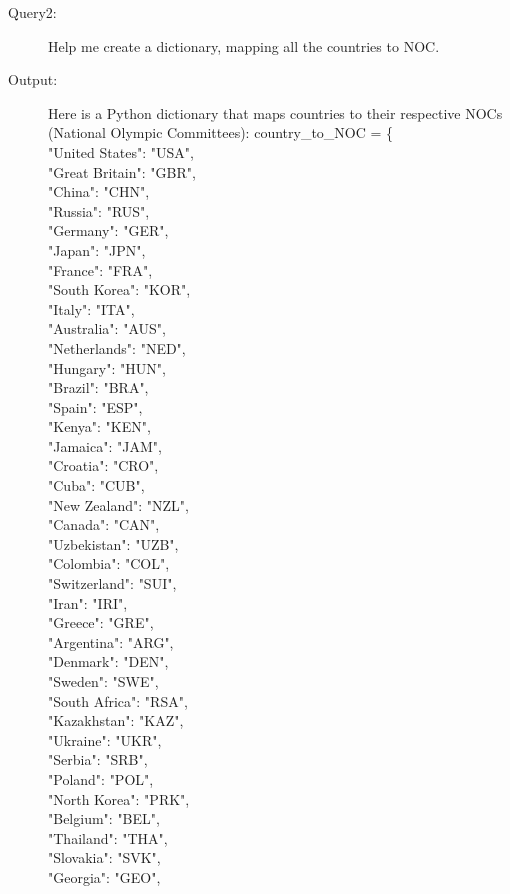 \documentclass{mcmthesis}
\begin{document}
\begin{enumerate}
\begin{description}
\item[Query2:] Help me create a dictionary, mapping all the countries to NOC.
\item[Output:] Here is a Python dictionary that maps countries to their respective NOCs (National Olympic Committees):
country\_to\_NOC = \{ \\
"United States": "USA",\\
"Great Britain": "GBR",\\
"China": "CHN",\\
"Russia": "RUS",\\
"Germany": "GER",\\
"Japan": "JPN",\\
"France": "FRA",\\
"South Korea": "KOR",\\
"Italy": "ITA",\\
"Australia": "AUS",\\
"Netherlands": "NED",\\
"Hungary": "HUN",\\
"Brazil": "BRA",\\
"Spain": "ESP",\\
"Kenya": "KEN",\\
"Jamaica": "JAM",\\
"Croatia": "CRO",\\
"Cuba": "CUB",\\
"New Zealand": "NZL",\\
"Canada": "CAN",\\
"Uzbekistan": "UZB",\\
"Colombia": "COL",\\
"Switzerland": "SUI",\\
"Iran": "IRI",\\
"Greece": "GRE",\\
"Argentina": "ARG",\\
"Denmark": "DEN",\\
"Sweden": "SWE",\\
"South Africa": "RSA",\\
"Kazakhstan": "KAZ",\\
"Ukraine": "UKR",\\
"Serbia": "SRB",\\
"Poland": "POL",\\
"North Korea": "PRK",\\
"Belgium": "BEL",\\
"Thailand": "THA",\\
"Slovakia": "SVK",\\
"Georgia": "GEO",\\

\end{description}
\end{enumerate}
\end{document}
